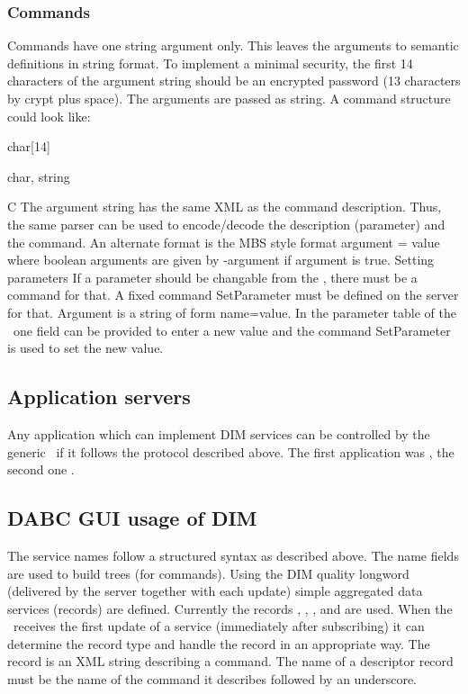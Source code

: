 \subsubsection{Commands}
Commands have one string argument only. This leaves the arguments to semantic definitions in string format. To implement a minimal security, the first 14 characters of the argument string should be an encrypted password (13 characters by crypt plus space). The arguments are passed as string. A command structure could look like:
\bdes
\item[password]   char[14]
\item[argument]   char,  string
\item[Format:] C
\edes
The argument string has the same XML as the command description. Thus, the same parser can be used to encode/decode the description (parameter) and the command. An alternate format is the MBS style format argument = value where boolean arguments are given by -argument if argument is true.
Setting parameters
If a parameter should be changable from the \gui, there must be a command for that. A fixed command SetParameter must be defined on the server for that. Argument is a string of form name=value. In the parameter table of the \gui~one field can be provided to enter a new value and the command SetParameter is used to set the new value.
\subsection{Application servers}
Any application which can implement DIM services can be controlled by the generic \gui~if it follows the protocol described above. The first application was \dabc, the second one \mbs.
\subsection{DABC GUI usage of DIM}
The service names follow a structured syntax as described above. The name fields are used to
build trees (for commands). Using the DIM quality longword (delivered by the server together
with each update) simple aggregated data services (records) are defined.
Currently the records , , ,  and 
are used. When the \gui~receives the first update of a service (immediately after subscribing)
it can determine the record type and handle the record in an appropriate way.
The  record is an XML string describing a command.
The name of a descriptor record must be the name of the command it describes followed by an underscore.
